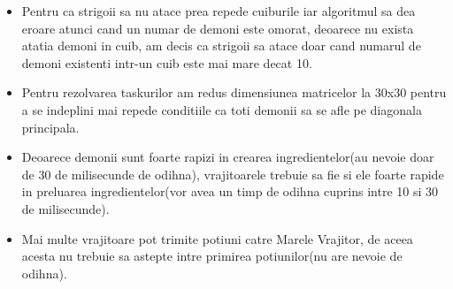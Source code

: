 \documentclass{article}
\begin{document}
\begin{itemize}
    \item Pentru ca strigoii sa nu atace prea repede cuiburile iar algoritmul sa dea eroare atunci cand un numar de demoni este omorat, deoarece nu exista atatia demoni in cuib, am decis ca strigoii sa atace doar cand numarul de demoni existenti intr-un cuib este mai mare decat 10. 
    \item Pentru rezolvarea taskurilor am redus dimensiunea matricelor la 30x30 pentru a se indeplini mai repede conditiile ca toti demonii sa se afle pe diagonala principala.
    \item Deoarece demonii sunt foarte rapizi in crearea ingredientelor(au nevoie doar de 30 de milisecunde de odihna), vrajitoarele trebuie sa fie si ele foarte rapide in preluarea ingredientelor(vor avea un timp de odihna cuprins intre 10 si 30 de milisecunde).
    \item Mai multe vrajitoare pot trimite potiuni catre Marele Vrajitor, de aceea acesta nu trebuie sa astepte intre primirea potiunilor(nu are nevoie de odihna).
    
\end{itemize}
\end{document}

